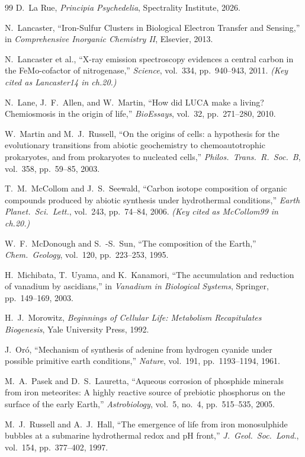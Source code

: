 \begin{thebibliography}{99}
D.~La Rue,
\emph{Principia Psychedelia},
Spectrality Institute, 2026.

N.~Lancaster,
``Iron-Sulfur Clusters in Biological Electron Transfer and Sensing,''
in \emph{Comprehensive Inorganic Chemistry II}, Elsevier, 2013.

N.~Lancaster et al.,
``X-ray emission spectroscopy evidences a central carbon in the FeMo-cofactor of nitrogenase,''
\emph{Science}, vol.~334, pp.~940--943, 2011.
\textit{(Key cited as Lancaster14 in ch.20.)}

N.~Lane, J.~F.~Allen, and W.~Martin,
``How did LUCA make a living? Chemiosmosis in the origin of life,''
\emph{BioEssays}, vol.~32, pp.~271--280, 2010.

W.~Martin and M.~J.~Russell,
``On the origins of cells: a hypothesis for the evolutionary transitions from
abiotic geochemistry to chemoautotrophic prokaryotes, and from prokaryotes to
nucleated cells,''
\emph{Philos.\ Trans.\ R.\ Soc.\ B}, vol.~358, pp.~59--85, 2003.

T.~M.~McCollom and J.~S.~Seewald,
``Carbon isotope composition of organic compounds produced by abiotic synthesis under hydrothermal conditions,''
\emph{Earth Planet.\ Sci.\ Lett.}, vol.~243, pp.~74--84, 2006.
\textit{(Key cited as McCollom99 in ch.20.)}

W.~F.~McDonough and S.~-S.~Sun,
``The composition of the Earth,''
\emph{Chem.\ Geology}, vol.~120, pp.~223--253, 1995.

H.~Michibata, T.~Uyama, and K.~Kanamori,
``The accumulation and reduction of vanadium by ascidians,''
in \emph{Vanadium in Biological Systems}, Springer, pp.~149--169, 2003.

H.~J.~Morowitz,
\emph{Beginnings of Cellular Life: Metabolism Recapitulates Biogenesis},
Yale University Press, 1992.

J.~Or\'o,
``Mechanism of synthesis of adenine from hydrogen cyanide under possible primitive earth conditions,''
\emph{Nature}, vol.~191, pp.~1193--1194, 1961.

M.~A.~Pasek and D.~S.~Lauretta,
``Aqueous corrosion of phosphide minerals from iron meteorites: A highly reactive source of prebiotic phosphorus on the surface of the early Earth,''
\emph{Astrobiology}, vol.~5, no.~4, pp.~515--535, 2005.

M.~J.~Russell and A.~J.~Hall,
``The emergence of life from iron monosulphide bubbles at a submarine hydrothermal
redox and pH front,''
\emph{J.\ Geol.\ Soc.\ Lond.}, vol.~154, pp.~377--402, 1997.


\end{thebibliography}
